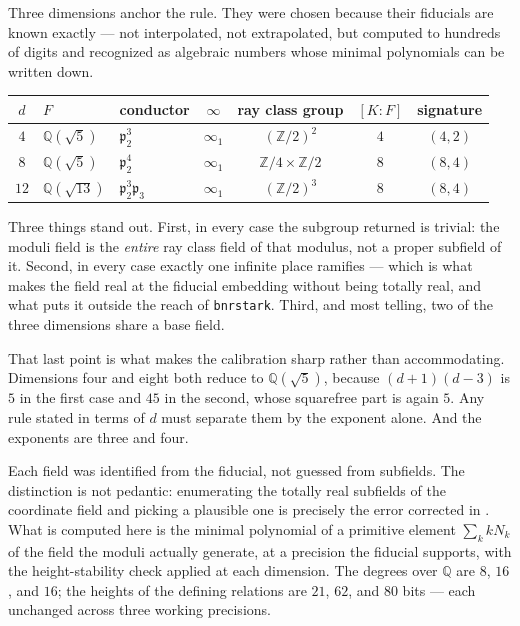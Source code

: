 \documentclass[12pt,a4paper]{article}
\newcommand{\Fd}{F}
\newcommand{\pt}{\mathfrak{p}_2}
\begin{document}
Three dimensions anchor the rule. They were chosen because their fiducials are known exactly — not interpolated, not extrapolated, but computed to hundreds of digits and recognized as algebraic numbers whose minimal polynomials can be written down.

\begin{center}
\begin{tabular}{@{}cllcccc@{}}
\toprule
$d$ & $\Fd$ & conductor & $\infty$ & ray class group & $[K:\Fd]$ & signature \\
\midrule
$4$  & $\mathbb{Q}(\sqrt5)$    & $\pt^3$               & $\infty_1$ & $(\mathbb{Z}/2)^2$ & $4$ & $(4,2)$ \\
$8$  & $\mathbb{Q}(\sqrt5)$    & $\pt^4$               & $\infty_1$ & $\mathbb{Z}/4\times\mathbb{Z}/2$ & $8$ & $(8,4)$ \\
$12$ & $\mathbb{Q}(\sqrt{13})$ & $\pt^3\mathfrak{p}_3$ & $\infty_1$ & $(\mathbb{Z}/2)^3$ & $8$ & $(8,4)$ \\
\bottomrule
\end{tabular}
\end{center}

Three things stand out. First, in every case the subgroup returned is trivial: the moduli field is the \emph{entire} ray class field of that modulus, not a proper subfield of it. Second, in every case exactly one infinite place ramifies — which is what makes the field real at the fiducial embedding without being totally real, and what puts it outside the reach of \texttt{bnrstark}. Third, and most telling, two of the three dimensions share a base field.

That last point is what makes the calibration sharp rather than accommodating. Dimensions four and eight both reduce to $\mathbb{Q}(\sqrt5)$, because $(d+1)(d-3)$ is $5$ in the first case and $45$ in the second, whose squarefree part is again $5$. Any rule stated in terms of $d$ must separate them by the exponent alone. And the exponents are three and four.

Each field was identified from the fiducial, not guessed from subfields. The distinction is not pedantic: enumerating the totally real subfields of the coordinate field and picking a plausible one is precisely the error corrected in . What is computed here is the minimal polynomial of a primitive element $\sum_k k N_k$ of the field the moduli actually generate, at a precision the fiducial supports, with the height-stability check applied at each dimension. The degrees over $\mathbb{Q}$ are $8$, $16$, and $16$; the heights of the defining relations are $21$, $62$, and $80$ bits — each unchanged across three working precisions.
\end{document}
